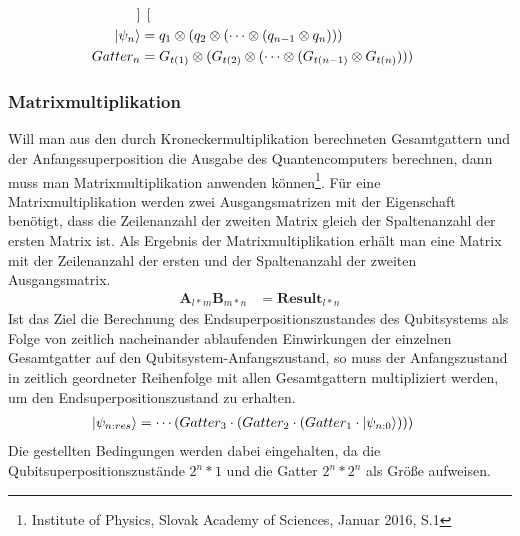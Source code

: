 \documentclass[12pt]{report}
\begin{document}
\begin{align*}
\begin{bmatrix}
	\end{bmatrix}\\
	\ket{\psi_n} &= q_1 \otimes (q_2 \otimes(\cdots \otimes (q_{n-1} \otimes q_n))) \\
	Gatter_n &= G_{t(1)} \otimes (G_{t(2)} \otimes(\cdots \otimes (G_{t(n-1)} \otimes G_{t(n)})))
	\end{align*}

\subsubsection{Matrixmultiplikation}						%
Will man aus den durch Kroneckermultiplikation berechneten Gesamtgattern und der Anfangssuperposition die Ausgabe des Quantencomputers berechnen, dann muss man Matrixmultiplikation anwenden können\footnote{Institute of Physics, Slovak Academy of Sciences, Januar 2016, S.1}. Für eine Matrixmultiplikation werden zwei Ausgangsmatrizen mit der Eigenschaft benötigt, dass die Zeilenanzahl der zweiten Matrix gleich der Spaltenanzahl der ersten Matrix ist. Als Ergebnis der Matrixmultiplikation erhält man eine Matrix mit der Zeilenanzahl der ersten und der Spaltenanzahl der zweiten Ausgangsmatrix.
\begin{align*}
	\textbf{A}_{l*m}\textbf{B}_{m*n} &= \textbf{Result}_{l*n}
\end{align*}
Ist das Ziel die Berechnung des Endsuperpositionszustandes des Qubitsystems als Folge von zeitlich nacheinander ablaufenden Einwirkungen der einzelnen Gesamtgatter auf den Qubitsystem-Anfangszustand, so muss der Anfangszustand in zeitlich geordneter Reihenfolge mit allen Gesamtgattern multipliziert werden, um den Endsuperpositionszustand zu erhalten.
\begin{align*}
	\ket{\psi_{n:res}} &= \cdots(Gatter_3 \cdot (Gatter_2 \cdot (Gatter_1 \cdot \ket{\psi_{n:0}})))
\end{align*}
Die gestellten Bedingungen werden dabei eingehalten, da die Qubitsuperpositionszustände $2^n*1$ und die Gatter $2^n*2^n$ als Größe aufweisen.\\
\end{document}
